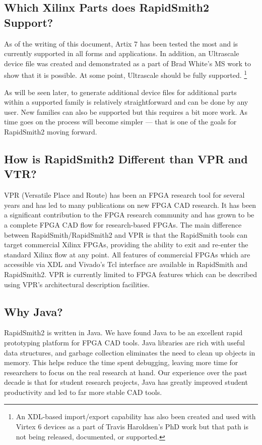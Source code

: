 \subsection{Which Xilinx Parts does RapidSmith2 Support?}
As of the writing of this document, Artix 7 has been tested the most and is
currently supported in all forms and applications.  In addition, an Ultrascale
device file was created and demonstrated as a part of Brad White's MS work to
show that it is possible. At some point, Ultrascale should be fully supported.
\footnote{An XDL-based import/export capability has also been created and used
with Virtex 6 devices as a part of Travis Haroldsen's PhD work but that path is
not being released, documented, or supported.}

As will be seen later, to generate additional device files for additional parts
within a supported family is relatively straightforward and can be done by any
user.  New families can also be supported but this
requires a bit more work.  As time goes on the process will become simpler ---
that is one of the goals for RapidSmith2 moving forward.

\subsection{How is RapidSmith2 Different than VPR and VTR?}
VPR (Versatile Place and Route) has been an FPGA research tool for several years
and has led to many publications on new FPGA CAD research. It has been a
significant contribution to the FPGA research community and has grown to be a
complete FPGA CAD flow for research-based FPGAs. The main difference between
RapidSmith/RapidSmith2 and VPR is that the RapidSmith tools can target commercial Xilinx
FPGAs, providing the ability to exit and re-enter the standard Xilinx flow at
any point.  All features of commercial FPGAs which are accessible via XDL and
Vivado's Tcl interface are available in RapidSmith and RapidSmith2. VPR is currently
limited to FPGA features which can be described using VPR's architectural
description facilities.

\subsection{Why Java?}
RapidSmith2 is written in Java. We have found Java to be an excellent rapid prototyping
platform for FPGA CAD tools.  Java libraries are rich with useful data
structures, and garbage collection eliminates the need to clean up objects in
memory. This helps reduce the time spent debugging, leaving more
time for researchers to focus on the real research at hand.  Our experience over
the past decade is that for student research projects, Java has greatly improved
student productivity and led to far more stable CAD tools.
